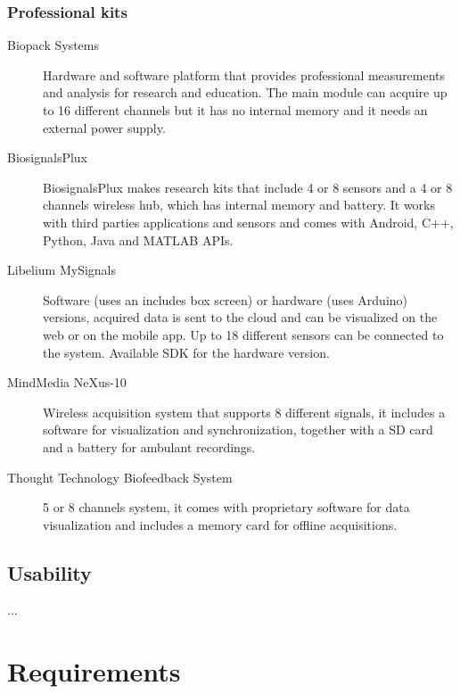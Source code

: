 \documentclass[binding=0.6cm,LaM]{sapthesis}
\begin{document}
\subsection{Professional kits}

\begin{description}

\item[Biopack Systems]
Hardware and software platform that provides professional measurements and analysis for research and education. The main module can acquire up to 16 different channels but it has no internal memory and it needs an external power supply.

\item[BiosignalsPlux]
BiosignalsPlux makes research kits that include 4 or 8 sensors and a 4 or 8 channels wireless hub, which has internal memory and battery. It works with third parties applications and sensors and comes with  Android, C++, Python, Java and MATLAB APIs.

\item[Libelium MySignals]
Software (uses an includes box screen) or hardware (uses Arduino) versions, acquired data is sent to the cloud and can be visualized on the web or on the mobile app. Up to 18 different sensors can be connected to the system. Available SDK for the hardware version.

\item[MindMedia NeXus-10]
Wireless acquisition system that supports 8 different signals, it includes a software for visualization and synchronization, together with a SD card and a battery for ambulant recordings.

\item[Thought Technology Biofeedback System]
5 or 8 channels system, it comes with proprietary software for data visualization and includes a memory card for offline acquisitions.

\end{description}



\section{Usability}
...


\chapter{Requirements}



\end{document}
